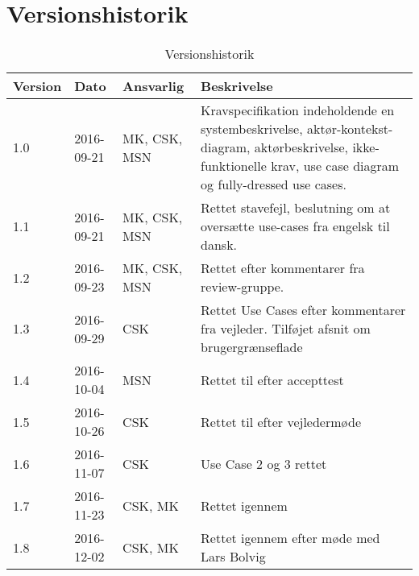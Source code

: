 \chapter{Versionshistorik}\label{Versionshistorik}

\begin{table}[htb]
\begin{tabular}{ | l | l | l | p{} | }
  \hline
  \textbf{Version} & \textbf{Dato} & \textbf{Ansvarlig} & \textbf{Beskrivelse} \\ \hline
  1.0 & 2016-09-21 & MK, CSK, MSN & Kravspecifikation indeholdende en systembeskrivelse, aktør-kontekst-diagram, aktørbeskrivelse, ikke-funktionelle krav, use case diagram og fully-dressed use cases.\\ \hline
  1.1 & 2016-09-21 & MK, CSK, MSN & Rettet stavefejl, beslutning om at oversætte use-cases fra engelsk til dansk. \\ \hline
  1.2 & 2016-09-23 & MK, CSK, MSN & Rettet efter kommentarer fra review-gruppe. \\\hline
  1.3 & 2016-09-29 & CSK & Rettet Use Cases efter kommentarer fra vejleder. Tilføjet afsnit om brugergrænseflade \\\hline
  1.4 & 2016-10-04 & MSN & Rettet til efter accepttest \\\hline
  1.5 & 2016-10-26 & CSK & Rettet til efter vejledermøde \\\hline
  1.6 & 2016-11-07 & CSK & Use Case 2 og 3 rettet \\\hline
  1.7 & 2016-11-23 & CSK, MK & Rettet igennem \\\hline
  1.8 & 2016-12-02 & CSK, MK & Rettet igennem efter møde med Lars Bolvig \\\hline
\end{tabular}
\caption{Versionshistorik}
\end{table}
